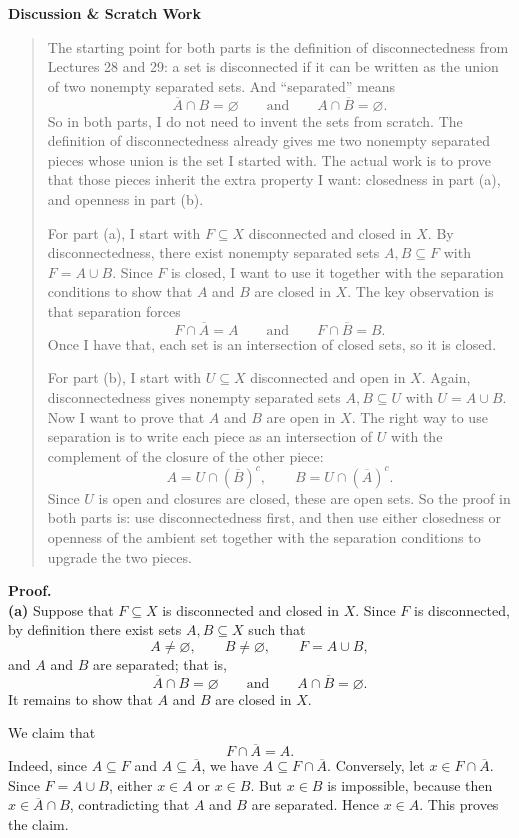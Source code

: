 \documentclass[12pt]{article}
\newenvironment{scratch}{%
  \par\smallskip
  \noindent\textbf{Discussion \& Scratch Work}\begin{quote}\small
}{%
  \end{quote}\smallskip
}
\begin{document}
\begin{scratch}
The starting point for both parts is the definition of disconnectedness from Lectures 28 and 29: a set is disconnected if it can be written as the union of two nonempty separated sets. And ``separated'' means
\[
\overline{A}\cap B=\varnothing
\qquad\text{and}\qquad
A\cap\overline{B}=\varnothing.
\]
So in both parts, I do not need to invent the sets from scratch. The definition of disconnectedness already gives me two nonempty separated pieces whose union is the set I started with. The actual work is to prove that those pieces inherit the extra property I want: closedness in part (a), and openness in part (b).

For part (a), I start with $F\subseteq X$ disconnected and closed in $X$. By disconnectedness, there exist nonempty separated sets $A,B\subseteq F$ with $F=A\cup B$. Since $F$ is closed, I want to use it together with the separation conditions to show that $A$ and $B$ are closed in $X$. The key observation is that separation forces
\[
F\cap\overline{A}=A
\qquad\text{and}\qquad
F\cap\overline{B}=B.
\]
Once I have that, each set is an intersection of closed sets, so it is closed.

For part (b), I start with $U\subseteq X$ disconnected and open in $X$. Again, disconnectedness gives nonempty separated sets $A,B\subseteq U$ with $U=A\cup B$. Now I want to prove that $A$ and $B$ are open in $X$. The right way to use separation is to write each piece as an intersection of $U$ with the complement of the closure of the other piece:
\[
A=U\cap (\overline{B})^c,
\qquad
B=U\cap (\overline{A})^c.
\]
Since $U$ is open and closures are closed, these are open sets. So the proof in both parts is: use disconnectedness first, and then use either closedness or openness of the ambient set together with the separation conditions to upgrade the two pieces.
\end{scratch}

\textbf{Proof.}\\
\textbf{(a)} Suppose that $F\subseteq X$ is disconnected and closed in $X$. Since $F$ is disconnected, by definition there exist sets $A,B\subseteq X$ such that
\[
A\neq\varnothing,
\qquad
B\neq\varnothing,
\qquad
F=A\cup B,
\]
and $A$ and $B$ are separated; that is,
\[
\overline{A}\cap B=\varnothing
\qquad\text{and}\qquad
A\cap\overline{B}=\varnothing.
\]
It remains to show that $A$ and $B$ are closed in $X$.

We claim that
\[
F\cap\overline{A}=A.
\]
Indeed, since $A\subseteq F$ and $A\subseteq\overline{A}$, we have $A\subseteq F\cap\overline{A}$. Conversely, let $x\in F\cap\overline{A}$. Since $F=A\cup B$, either $x\in A$ or $x\in B$. But $x\in B$ is impossible, because then $x\in \overline{A}\cap B$, contradicting that $A$ and $B$ are separated. Hence $x\in A$. This proves the claim.
\end{document}
